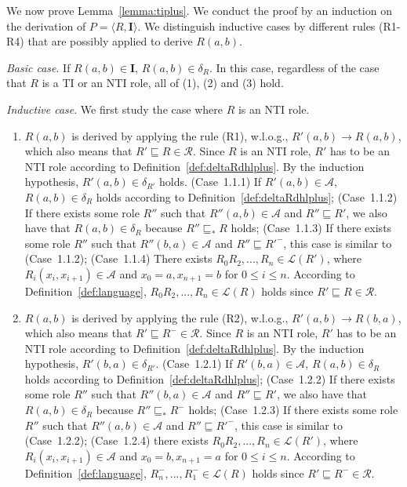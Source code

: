 \documentclass[final,1p,times]{elsarticle}
\begin{document}
We now prove Lemma~\ref{lemma:tiplus}.
We conduct the proof by an induction on
the derivation of $P=\langle R,\textbf{I}\rangle$. We distinguish inductive cases by different rules (R1-R4)
that are possibly applied to derive $R(a,b)$.

\emph{Basic case}. If $R(a,b)\in\textbf{I}$, $R(a,b)\in\delta_{R}$. In this case,
regardless of the case that $R$ is a TI or an NTI role, all of (1), (2) and (3) hold.

\emph{Inductive case}. We first study the case where $R$ is an NTI role.

\begin{enumerate}[leftmargin=12ex,label=Case~1.\arabic*, ref=Case~1.\arabic*]
\item $R(a,b)$ is derived by applying the rule (R1), w.l.o.g., $R'(a,b)\rightarrow R(a,b)$,
    which also means that $R'\sqsubseteq R\in\mathcal{R}$. Since $R$ is an NTI role, $R'$ has to
    be an NTI role according to Definition~\ref{def:deltaRdhlplus}. By the induction hypothesis,
    $R'(a,b)\in\delta_{R'}$ holds. (Case~1.1.1) If $R'(a,b)\in\mathcal{A}$, $R(a,b)\in\delta_{R}$
    holds according to Definition~\ref{def:deltaRdhlplus}; (Case~1.1.2) If there exists some
    role $R''$ such that $R''(a,b)\in\mathcal{A}$ and $R''\sqsubseteq R'$, we also have that
    $R(a,b)\in\delta_{R}$ because $R''\sqsubseteq_* R$ holds; (Case~1.1.3) If there exists some
    role $R''$ such that $R''(b,a)\in\mathcal{A}$ and $R''\sqsubseteq R'^-$, this case is
    similar to (Case~1.1.2); (Case~1.1.4) There exists $R_0R_2,...,R_n\in\mathcal{L}(R')$,
    where $R_i(x_i,x_{i+1})\in\mathcal{A}$ and $x_0=a, x_{n+1}=b$ for $0\leq i\leq n$.
    According to Definition~\ref{def:language}, $R_0R_2,...,R_n\in\mathcal{L}(R)$ holds since
    $R'\sqsubseteq R\in\mathcal{R}$.\label{dhlplus:NTIcaseR1}

\item $R(a,b)$ is derived by applying the rule (R2), w.l.o.g., $R'(a,b)\rightarrow R(b,a)$,
    which also means that $R'\sqsubseteq R^-\in\mathcal{R}$. Since $R$ is an NTI role, $R'$ has to
    be an NTI role according to Definition~\ref{def:deltaRdhlplus}. By the induction hypothesis,
    $R'(b,a)\in\delta_{R'}$. (Case~1.2.1) If $R'(b,a)\in\mathcal{A}$, $R(a,b)\in\delta_{R}$
    holds according to Definition~\ref{def:deltaRdhlplus}; (Case~1.2.2) If there exists some
    role $R''$ such that $R''(b,a)\in\mathcal{A}$ and $R''\sqsubseteq R'$, we also have that
    $R(a,b)\in\delta_{R}$ because $R''\sqsubseteq_* R^-$ holds; (Case~1.2.3) If there exists some
    role $R''$ such that $R''(a,b)\in\mathcal{A}$ and $R''\sqsubseteq R'^-$, this case is
    similar to (Case~1.2.2); (Case~1.2.4) there exists $R_0R_2,...,R_n\in\mathcal{L}(R')$,
    where $R_i(x_i,x_{i+1})\in\mathcal{A}$ and $x_0=b, x_{n+1}=a$ for $0\leq i\leq n$.
    According to Definition~\ref{def:language}, $R_n^-,...,R_1^-\in\mathcal{L}(R)$ holds since
    $R'\sqsubseteq R^-\in\mathcal{R}$.\label{dhlplus:NTIcaseR2}


\end{enumerate}
\end{document}
